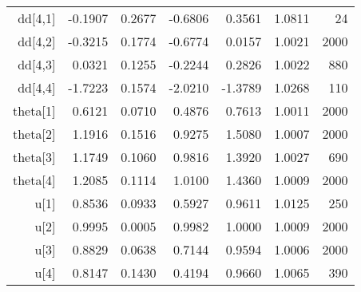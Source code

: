 \begin{table}[ht]
\begin{tabular}{rrrrrrr}
  dd[4,1] & -0.1907 & 0.2677 & -0.6806 & 0.3561 & 1.0811 &    24 \\ 
  dd[4,2] & -0.3215 & 0.1774 & -0.6774 & 0.0157 & 1.0021 &  2000 \\ 
  dd[4,3] & 0.0321 & 0.1255 & -0.2244 & 0.2826 & 1.0022 &   880 \\ 
  dd[4,4] & -1.7223 & 0.1574 & -2.0210 & -1.3789 & 1.0268 &   110 \\ 
  theta[1] & 0.6121 & 0.0710 & 0.4876 & 0.7613 & 1.0011 &  2000 \\ 
  theta[2] & 1.1916 & 0.1516 & 0.9275 & 1.5080 & 1.0007 &  2000 \\ 
  theta[3] & 1.1749 & 0.1060 & 0.9816 & 1.3920 & 1.0027 &   690 \\ 
  theta[4] & 1.2085 & 0.1114 & 1.0100 & 1.4360 & 1.0009 &  2000 \\ 
  u[1] & 0.8536 & 0.0933 & 0.5927 & 0.9611 & 1.0125 &   250 \\ 
  u[2] & 0.9995 & 0.0005 & 0.9982 & 1.0000 & 1.0009 &  2000 \\ 
  u[3] & 0.8829 & 0.0638 & 0.7144 & 0.9594 & 1.0006 &  2000 \\ 
  u[4] & 0.8147 & 0.1430 & 0.4194 & 0.9660 & 1.0065 &   390 \\ 
   \hline
\end{tabular}
\end{table}
